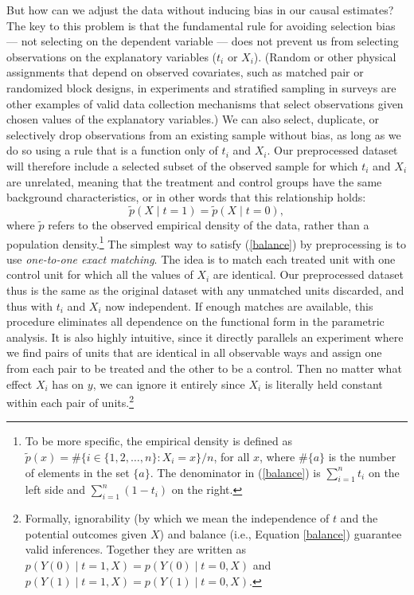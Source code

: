 \documentclass[11pt,titlepage]{article}
\begin{document}
But how can we adjust the data without inducing bias in our causal
estimates?  The key to this problem is that the fundamental rule for
avoiding selection bias --- not selecting on the dependent variable
--- does not prevent us from selecting observations on the explanatory
variables ($t_i$ or $X_i$).  (Random or other physical assignments
that depend on observed covariates, such as matched pair or randomized
block designs, in experiments and stratified sampling in surveys are
other examples of valid data collection mechanisms that select
observations given chosen values of the explanatory variables.)  We
can also select, duplicate, or selectively drop observations from an
existing sample without bias, as long as we do so using a rule that is
a function only of $t_i$ and $X_i$.  Our preprocessed dataset will
therefore include a selected subset of the observed sample for which
$t_i$ and $X_i$ are unrelated, meaning that the treatment and control
groups have the same background characteristics, or in other words
that this relationship holds:
\begin{equation}
  \label{balance}
  \tilde p(X\mid t=1) = \tilde p(X\mid t=0),
\end{equation}
where $\tilde p$ refers to the observed empirical density of the data,
rather than a population density.\footnote{To be more specific, the
  empirical density is defined as $\tilde p(x) = \# \{ i\in \{1, 2,
  \dots, n \}: X_i = x \} / n$, for all $x$, where $\#\{a\}$ is the
  number of elements in the set $\{a\}$.  The denominator in
  (\ref{balance}) is $\sum_{i=1}^n t_i$ on the left side and
  $\sum_{i=1}^n (1-t_i)$ on the right.}  The simplest way to satisfy
(\ref{balance}) by preprocessing is to use \emph{one-to-one exact
  matching}.  The idea is to match each treated unit with one control
unit for which all the values of $X_i$ are identical.  Our
preprocessed dataset thus is the same as the original dataset with any
unmatched units discarded, and thus with $t_i$ and $X_i$ now
independent.  If enough matches are available, this procedure
eliminates all dependence on the functional form in the parametric
analysis.  It is also highly intuitive, since it directly parallels an
experiment where we find pairs of units that are identical in all
observable ways and assign one from each pair to be treated and the
other to be a control.  Then no matter what effect $X_i$ has on $y$,
we can ignore it entirely since $X_i$ is literally held constant
within each pair of units.\footnote{Formally, ignorability (by which
  we mean the independence of $t$ and the potential outcomes given
  $X$) and balance (i.e., Equation \ref{balance}) guarantee valid
  inferences.  Together they are written as $p(Y(0)\mid
  t=1,X)=p(Y(0)\mid t=0,X)$ and $p(Y(1)\mid t=1,X)=p(Y(1)\mid
  t=0,X)$.}
\end{document}
